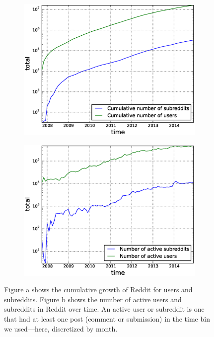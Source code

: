 \begin{figure}[!tb]
\centering
\begin{subfigure}{.49\textwidth}\includegraphics[scale=0.4]{./images/cumulative_users_subreddits.eps}\caption{}\end{subfigure}
\begin{subfigure}{.49\textwidth}\includegraphics[scale=0.4]{./images/active_users_subreddits.eps}\caption{}\end{subfigure}
\caption{Figure a shows the cumulative growth of Reddit for users and subreddits. Figure b shows the number of active users and subreddits in Reddit over time. An active user or subreddit is one that had at least one post (comment or submission) in the time bin we used---here, discretized by month.}
\label{fig:cumulative}
\end{figure}


